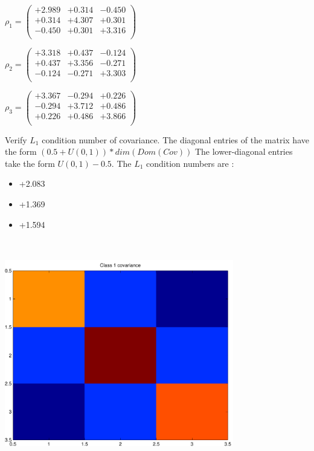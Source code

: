 \documentclass[9pt]{article}
\theoremstyle{plain}
\theoremstyle{definition}
\theoremstyle{remark}
\numberwithin{equation}{section}
\begin{document}
$\rho_1 = \left(
\begin{array}{
ccc}
+2.989 & +0.314 & -0.450 \\
+0.314 & +4.307 & +0.301 \\
-0.450 & +0.301 & +3.316 \\
\end{array}
\right)$ \newline 

$\rho_2 = \left(
\begin{array}{
ccc}
+3.318 & +0.437 & -0.124 \\
+0.437 & +3.356 & -0.271 \\
-0.124 & -0.271 & +3.303 \\
\end{array}
\right)$ \newline 

$\rho_3 = \left(
\begin{array}{
ccc}
+3.367 & -0.294 & +0.226 \\
-0.294 & +3.712 & +0.486 \\
+0.226 & +0.486 & +3.866 \\
\end{array}
\right)$ \newline 

Verify $L_1$ condition number of covariance. The diagonal entries of the matrix have the form $(0.5 + U(0,1) )*dim(Dom(Cov))$
The lower-diagonal entries take the form $U(0,1) - 0.5$. 
The $L_1$ condition numbers are :
\begin{itemize}
\item +2.083
\item +1.369
\item +1.594
\end{itemize}
\includegraphics[width=10.0cm,height=10.0cm]{rv1_corr.pdf}
\end{document}
